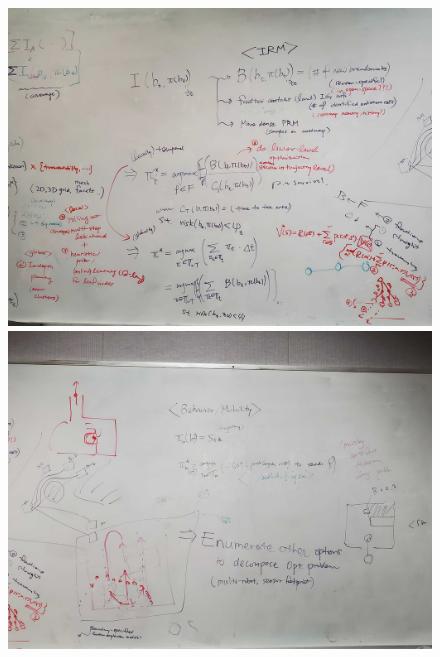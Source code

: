 \documentclass[letterpaper, 10 pt, conference]{ieeeconf}  %
\begin{document}
\begin{figure}[H]
  \centering
  \includegraphics[width=.9\textwidth]{figures/whiteboardII.jpg}
  \includegraphics[width=.9\textwidth]{figures/whiteboardIII.jpg}
\end{figure}
\clearpage
\end{document}
